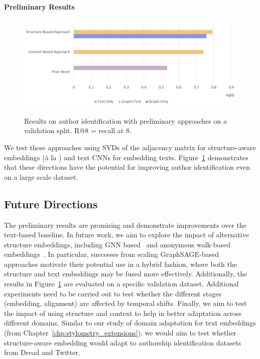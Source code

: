 \textbf{Preliminary Results}

\begin{figure}
    \centering
    \includegraphics[width=0.8\linewidth,alt={Bar plot of preliminary results on Reddit.}]{future_work/figures/reddit_scale_graph.pdf}
    \caption{Results on author identification with preliminary approaches on a validation split. R@8 = recall at 8.}
    \label{fig:future_work:scale:preliminary:results}
\end{figure}
We test these approaches using SVDs of the adjacency matrix for structure-aware embeddings (à la \citet{agterberg2020vertex}) and text CNNs for embedding texts.
Figure~\ref{fig:future_work:scale:preliminary:results} demonstrates that these directions have the potential for improving author identification even on a large scale dataset.

\subsection{Future Directions}
The preliminary results are promising and demonstrate improvements over the text-based baseline.
In future work, we aim to explore the impact of alternative structure embeddings, including GNN based~\cite{velivckovic2018graph,hamilton2017inductive} and anonymous walk-based embeddings~\citep{ivanov2018anonymous,wang2020inductive}.
In particular, successes from scaling GraphSAGE-based~\cite{hamilton2017inductive,ying2018graph} approaches motivate their potential use in a hybrid fashion, where both the structure and text embeddings may be fused more effectively.
Additionally, the results in Figure~\ref{fig:future_work:scale:preliminary:results} are evaluated on a specific validation dataset.
Additional experiments need to be carried out to test whether the different stages (embedding, alignment) are affected by temporal shifts.
Finally, we aim to test the impact of using structure and context to help in better adaptation across different domains.
Similar to our study of domain adaptation for text embeddings (from Chapter~\ref{chp:stylometry_extensions}), we would aim to test whether structure-aware embedding would adapt to authorship identification datasets from Dread and Twitter.

